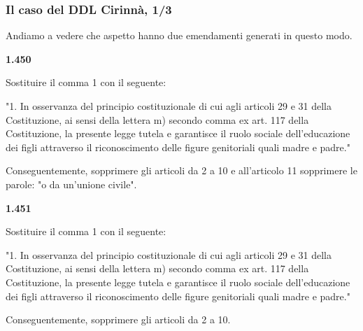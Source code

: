 \documentclass[12pt]{beamer}
\begin{document}
  \begin{frame}[fragile]
    \frametitle{Il caso del DDL Cirinnà, 1/3}

    Andiamo a vedere che aspetto hanno due emendamenti generati in questo modo.

    \vspace{0.25cm}

    \fontsize{2pt}{3}
    \textbf{1.450}
    \begin{semiverbatim}Sostituire il comma 1 con il seguente:

  "1. In osservanza del principio costituzionale di cui agli articoli 29 e 31
      della Costituzione, ai sensi della lettera m) secondo comma ex art. 117 della
      Costituzione, la presente legge tutela e garantisce il ruolo sociale
      dell'educazione dei figli attraverso il riconoscimento delle figure
      genitoriali quali madre e padre."

Conseguentemente, sopprimere gli articoli da 2 a 10 e all'articolo 11 sopprimere
le parole: "o da un'unione civile".
\end{semiverbatim}

    \fontsize{2pt}{3}
    \textbf{1.451}
    \begin{semiverbatim}Sostituire il comma 1 con il seguente:

  "1. In osservanza del principio costituzionale di cui agli articoli 29 e 31
      della Costituzione, ai sensi della lettera m) secondo comma ex art. 117 della
      Costituzione, la presente legge tutela e garantisce il ruolo sociale
      dell'educazione dei figli attraverso il riconoscimento delle figure
      genitoriali quali madre e padre."

Conseguentemente, sopprimere gli articoli da 2 a 10.
\end{semiverbatim}
\end{frame}
\end{document}
